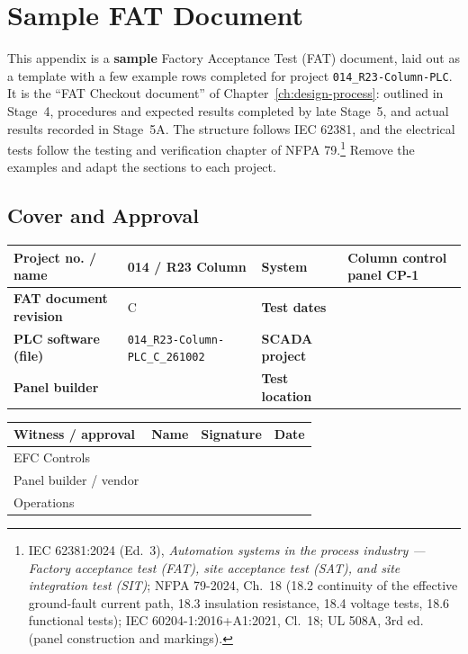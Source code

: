 \chapter{Sample FAT Document}
\label{app:sample-fat}
This appendix is a \textbf{sample} Factory Acceptance Test (FAT) document, laid out as a template with a few example rows completed for project \texttt{014\_R23-Column-PLC}. It is the ``FAT Checkout document'' of Chapter~\ref{ch:design-process}: outlined in Stage~4, procedures and expected results completed by late Stage~5, and actual results recorded in Stage~5A. The structure follows IEC 62381, and the electrical tests follow the testing and verification chapter of NFPA 79.\footnote{IEC 62381:2024 (Ed.~3), \emph{Automation systems in the process industry --- Factory acceptance test (FAT), site acceptance test (SAT), and site integration test (SIT)}; NFPA 79-2024, Ch.~18 (18.2 continuity of the effective ground-fault current path, 18.3 insulation resistance, 18.4 voltage tests, 18.6 functional tests); IEC 60204-1:2016+A1:2021, Cl.~18; UL 508A, 3rd ed. (panel construction and markings).} Remove the examples and adapt the sections to each project.

\newcommand{\fatcb}{$\square$}
\newcommand{\fatfld}{\rule[-0.28cm]{0pt}{0.75cm}}

\section{Cover and Approval}
\begin{center}
\begin{tabular}{@{}|P{4.35cm}|P{4.00cm}|P{3.26cm}|P{4.39cm}|@{}}
\hline
\textbf{Project no. / name} & 014 / R23 Column & \textbf{System} & Column control panel CP-1 \\ \hline
\textbf{FAT document revision} & C & \textbf{Test dates} & \\ \hline
\textbf{PLC software (file)} & \texttt{014\_R23-Column-PLC\_C\_261002} & \textbf{SCADA project} & \\ \hline
\textbf{Panel builder} & & \textbf{Test location} & \\ \hline
\end{tabular}
\end{center}
\begin{center}
\begin{tabular}{@{}|P{4.35cm}|P{4.00cm}|P{4.56cm}|P{3.09cm}|@{}}
\hline
{}\textbf{Witness / approval} & \textbf{Name} & \textbf{Signature} & \textbf{Date} \\ \hline
\fatfld EFC Controls & & & \\ \hline
\fatfld Panel builder / vendor & & & \\ \hline
\fatfld Operations & & & \\ \hline
\end{tabular}
\end{center}

